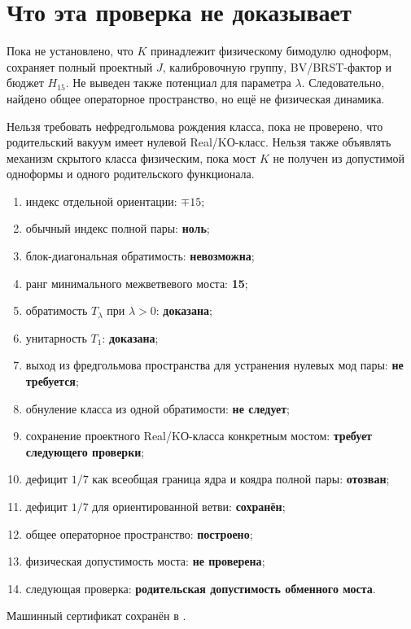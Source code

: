 \section{Что эта проверка не доказывает}

Пока не установлено, что $K$ принадлежит физическому бимодулю одноформ,
сохраняет полный проектный $J$, калибровочную группу, BV/BRST-фактор и
бюджет $H_{15}$. Не выведен также потенциал для параметра $\lambda$.
Следовательно, найдено общее операторное пространство, но ещё не физическая
динамика.

\begin{nogocriterion}
Нельзя требовать нефредгольмова рождения класса, пока не проверено, что
родительский вакуум имеет нулевой Real/KО-класс. Нельзя также объявлять
механизм скрытого класса физическим, пока мост $K$ не получен из
допустимой одноформы и одного родительского функционала.
\end{nogocriterion}

\begin{protocol}
\begin{enumerate}
 \item индекс отдельной ориентации: \textbf{$\mp15$};
 \item обычный индекс полной пары: \textbf{ноль};
 \item блок-диагональная обратимость: \textbf{невозможна};
 \item ранг минимального межветвевого моста: \textbf{15};
 \item обратимость $T_\lambda$ при $\lambda>0$: \textbf{доказана};
 \item унитарность $T_1$: \textbf{доказана};
 \item выход из фредгольмова пространства для устранения нулевых мод пары:
 \textbf{не требуется};
 \item обнуление класса из одной обратимости: \textbf{не следует};
 \item сохранение проектного Real/KО-класса конкретным мостом:
 \textbf{требует следующего проверки};
 \item дефицит $1/7$ как всеобщая граница ядра и коядра полной пары:
 \textbf{отозван};
 \item дефицит $1/7$ для ориентированной ветви: \textbf{сохранён};
 \item общее операторное пространство: \textbf{построено};
 \item физическая допустимость моста: \textbf{не проверена};
 \item следующая проверка:
 \textbf{родительская допустимость обменного моста}.
\end{enumerate}
\end{protocol}

Машинный сертификат сохранён в
.